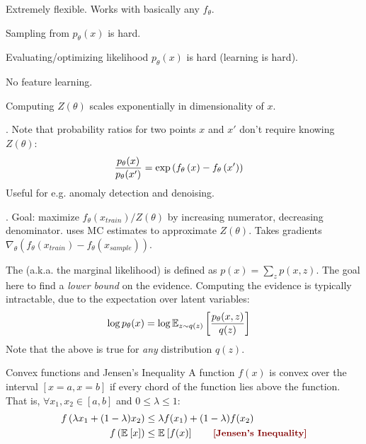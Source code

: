\documentclass[11pt]{article}
\newcommand\myspace[1][]{\vspace{#1\bigskipamount}\Needspace{10\baselineskip}}
\newcommand\p{\Needspace{10\baselineskip} \noindent}
\newcommand\bluesec[1]{\myspace \p \blue{#1}}
\begin{document}
\begin{compactitem}
	\item[\green{\cmark}] Extremely flexible. Works with basically any $f_{\theta}$.
	\item[\red{\xmark}] Sampling from $p_{\theta}(x)$ is hard.
	\item[\red{\xmark}] Evaluating/optimizing likelihood $p_{\theta}(x)$ is hard (learning is hard).
	\item[\red{\xmark}] No feature learning.
	\item[\red{\xmark}] Computing $Z(\theta)$ scales exponentially in dimensionality of $x$.
\end{compactitem}

\bluesec{Applications}. Note that probability ratios for two points $x$ and $x'$ don't require knowing $Z(\theta)$:
\begin{align}
	\frac{  p_{\theta}(x)  }{ p_{\theta}(x')  }
		&= \exp \lr{  f_{\theta}\lr{x}  -  f_{\theta}\lr{x'} }
\end{align}
Useful for e.g. anomaly detection and denoising.


\bluesec{Training}. Goal: maximize $f_{\theta}(x_{train}) / Z(\theta)$ by increasing numerator, decreasing denominator.  uses MC estimates to approximate $Z(\theta)$. Takes gradients $\nabla_{\theta}(f_{\theta}(x_{train})  - f_{\theta}(x_{sample}) )$.






\label{Concepts}



The  (a.k.a. the marginal likelihood) is defined as $p(x) = \sum_z p(x, z)$. The goal here to find a \textit{lower bound} on the evidence. Computing the evidence is typically intractable, due to the expectation over latent variables:
\begin{align}
	\log p_{\theta}(x)
		&= \log \E[z \sim q(z)]{\frac{ p_{\theta}(x, z)  }{ q(z)  }} 
\end{align}
Note that the above is true for \textit{any} distribution $q(z)$. 

\begin{definition}{Convex functions and Jensen's Inequality}
	A function $f(x)$ is convex over the interval $[x=a, x=b]$ if every chord of the function lies above the function. That is, $\forall x_1, x_2 \in [a, b]$ and $0 \le \lambda \le 1$:
\begin{align}
f\left(  \lambda x_1 + (1 - \lambda) x_2 \right) &\le \lambda f(x_1) + (1 - \lambda) f(x_2) \\
f\left( \E{x} \right) &\le \E{f(x)} \qquad \mtred{[Jensen's Inequality]} 
\end{align}
\end{definition}
\end{document}
